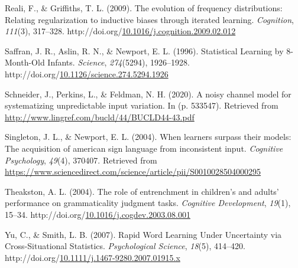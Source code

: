 \documentclass[10pt, letterpaper]{article}
\newenvironment{CSLReferences}%
  {}%
  {\par}
\begin{document}
\begin{CSLReferences}{1}{0}
\leavevmode{}%
Reali, F., \& Griffiths, T. L. (2009). The evolution of frequency
distributions: Relating regularization to inductive biases through
iterated learning. \emph{Cognition}, \emph{111}(3), 317--328.
http://doi.org/\href{https://doi.org/10.1016/j.cognition.2009.02.012}{10.1016/j.cognition.2009.02.012}

\leavevmode{}%
Saffran, J. R., Aslin, R. N., \& Newport, E. L. (1996). Statistical
Learning by 8-Month-Old Infants. \emph{Science}, \emph{274}(5294),
1926--1928.
http://doi.org/\href{https://doi.org/10.1126/science.274.5294.1926}{10.1126/science.274.5294.1926}

\leavevmode{}%
Schneider, J., Perkins, L., \& Feldman, N. H. (2020). A noisy channel
model for systematizing unpredictable input variation. In (p. 533547).
Retrieved from \url{http://www.lingref.com/bucld/44/BUCLD44-43.pdf}

\leavevmode{}%
Singleton, J. L., \& Newport, E. L. (2004). When learners surpass their
models: The acquisition of american sign language from inconsistent
input. \emph{Cognitive Psychology}, \emph{49}(4), 370407. Retrieved from
\url{https://www.sciencedirect.com/science/article/pii/S0010028504000295}

\leavevmode{}%
Theakston, A. L. (2004). The role of entrenchment in children{'}s and
adults{'} performance on grammaticality judgment tasks. \emph{Cognitive
Development}, \emph{19}(1), 15--34.
http://doi.org/\href{https://doi.org/10.1016/j.cogdev.2003.08.001}{10.1016/j.cogdev.2003.08.001}

\leavevmode{}%
Yu, C., \& Smith, L. B. (2007). Rapid Word Learning Under Uncertainty
via Cross-Situational Statistics. \emph{Psychological Science},
\emph{18}(5), 414--420.
http://doi.org/\href{https://doi.org/10.1111/j.1467-9280.2007.01915.x}{10.1111/j.1467-9280.2007.01915.x}

\end{CSLReferences}


\end{document}
